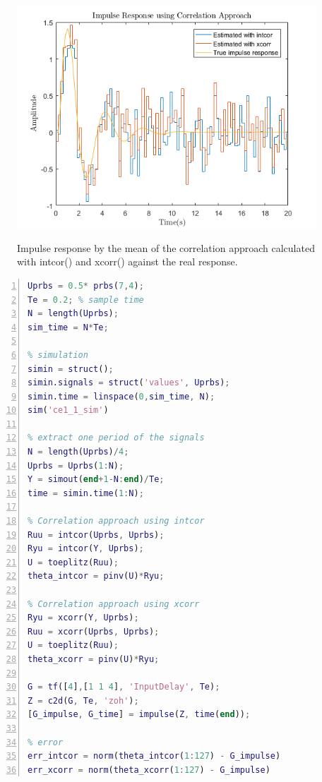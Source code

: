 \documentclass[a4paper,11pt]{article}
\begin{document}
\begin{figure}[H]
	\centering
    \includegraphics[height=9cm]{images/impulse_corr_app}
    \caption{Impulse response by the mean of the correlation approach calculated with intcor() and xcorr() against the real response.}
    \label{fig:corr_app}
\end{figure}

\begin{lstlisting}[language=Matlab,numbers=left,caption=Correlation approach,label=lst:corr_app]
% input signal
Uprbs = 0.5* prbs(7,4);
Te = 0.2; % sample time
N = length(Uprbs);
sim_time = N*Te;

% simulation
simin = struct();
simin.signals = struct('values', Uprbs);
simin.time = linspace(0,sim_time, N);
sim('ce1_1_sim')

% extract one period of the signals
N = length(Uprbs)/4;
Uprbs = Uprbs(1:N);
Y = simout(end+1-N:end)/Te;
time = simin.time(1:N);

% Correlation approach using intcor
Ruu = intcor(Uprbs, Uprbs);
Ryu = intcor(Y, Uprbs);
U = toeplitz(Ruu);
theta_intcor = pinv(U)*Ryu;

% Correlation approach using xcorr
Ryu = xcorr(Y, Uprbs);
Ruu = xcorr(Uprbs, Uprbs);
U = toeplitz(Ruu);
theta_xcorr = pinv(U)*Ryu;

G = tf([4],[1 1 4], 'InputDelay', Te);
Z = c2d(G, Te, 'zoh');
[G_impulse, G_time] = impulse(Z, time(end));

% error
err_intcor = norm(theta_intcor(1:127) - G_impulse)
err_xcorr = norm(theta_xcorr(1:127) - G_impulse)
\end{lstlisting}
\end{document}
